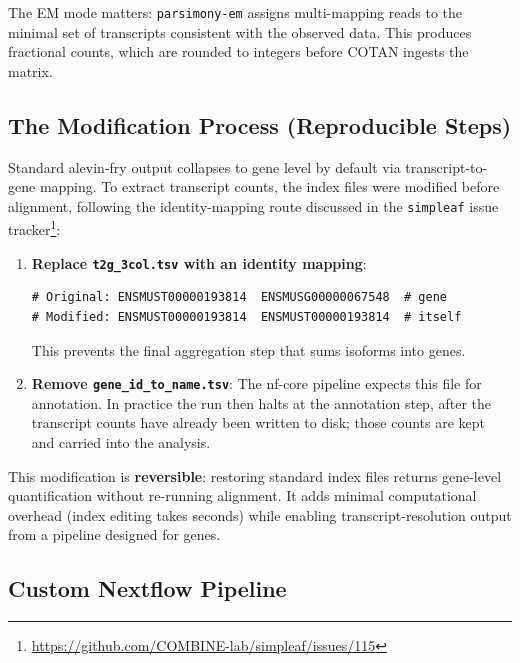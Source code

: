 The EM mode matters: \texttt{parsimony-em} assigns multi-mapping reads to the minimal set of transcripts consistent with the observed data. This produces fractional counts, which are rounded to integers before COTAN ingests the matrix.

\subsection*{The Modification Process (Reproducible Steps)}\label{sec:modification-process}

Standard alevin-fry\cite{he2022alevin} output collapses to gene level by default via transcript-to-gene mapping. To extract transcript counts, the index files were modified before alignment, following the identity-mapping route discussed in the \texttt{simpleaf} issue tracker\footnote{\url{https://github.com/COMBINE-lab/simpleaf/issues/115}}:

\begin{enumerate}
    \item \textbf{Replace \texttt{t2g\_3col.tsv} with an identity mapping}:
{\small\begin{verbatim}
# Original: ENSMUST00000193814  ENSMUSG00000067548  # gene
# Modified: ENSMUST00000193814  ENSMUST00000193814  # itself
\end{verbatim}}
    This prevents the final aggregation step that sums isoforms into genes.
    
    \item \textbf{Remove \texttt{gene\_id\_to\_name.tsv}}: The nf-core pipeline expects this file for annotation. In practice the run then halts at the annotation step, after the transcript counts have already been written to disk; those counts are kept and carried into the analysis.
\end{enumerate}

This modification is \textbf{reversible}: restoring standard index files returns gene-level quantification without re-running alignment. It adds minimal computational overhead (index editing takes seconds) while enabling transcript-resolution output from a pipeline designed for genes.

\subsection*{Custom Nextflow Pipeline}

